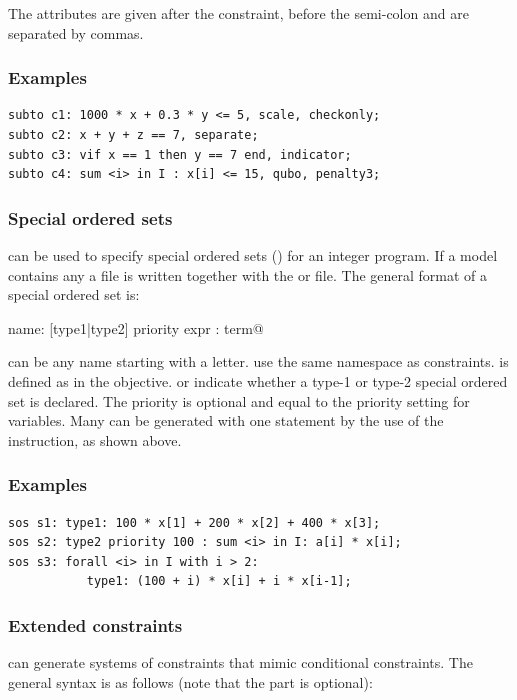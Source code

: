 \noindent
The attributes are given after the constraint, before the semi-colon
and are separated by commas.

\subsubsection{Examples}
{\small
\begin{verbatim}
subto c1: 1000 * x + 0.3 * y <= 5, scale, checkonly;
subto c2: x + y + z == 7, separate;
subto c3: vif x == 1 then y == 7 end, indicator;
subto c4: sum <i> in I : x[i] <= 15, qubo, penalty3;
\end{verbatim}
}


\subsubsection{Special ordered sets}
\zimpl can be used to specify special ordered sets (\sos) for an
integer program. If a model contains any \sos a  file is
written together with the  or  file.
The general format of a special ordered set is:

\smallskip
\verb@sos name: [type1|type2] priority expr : term@

\smallskip
\noindent {} can be any name starting with a letter. \sos use
the same namespace as constraints.
 is defined as in the objective.  or
 indicate whether a type-1 or type-2 special ordered set
is declared. The priority is optional and equal to the priority
setting for variables.
Many \sos can be generated with one statement by the use of the
 instruction, as shown above.

\subsubsection{Examples}
{\small
\begin{verbatim}
sos s1: type1: 100 * x[1] + 200 * x[2] + 400 * x[3];
sos s2: type2 priority 100 : sum <i> in I: a[i] * x[i];
sos s3: forall <i> in I with i > 2:
           type1: (100 + i) * x[i] + i * x[i-1];
\end{verbatim}
}

\subsubsection{Extended constraints}
\zimpl can generate systems of constraints that
mimic conditional constraints. The general syntax is as follows (note
that the  part is optional):

